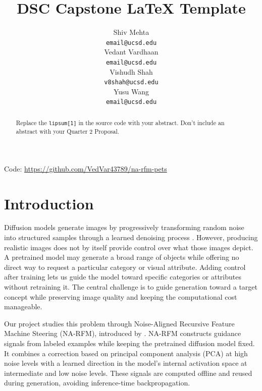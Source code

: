 \documentclass[12pt,letterpaper]{article}
\title{DSC Capstone LaTeX Template}
\author{Shiv Mehta \\
  {\tt email@ucsd.edu} \\\And
  Vedant Vardhaan \\
  {\tt email@ucsd.edu} \\\And
  Vishudh Shah \\
  {\tt v8shah@ucsd.edu} \\\And
  Yusu Wang \\
  {\tt email@ucsd.edu} \\}
\begin{document}
\maketitle


\begin{abstract}
    {
    \color{blue}
    Replace the \texttt{lipsum[1]} in the source code with your abstract. Don't include an abstract with your Quarter 2 Proposal.
    }
    \textcolor{LightGrey}{\lipsum[1]}
\end{abstract}

\begin{center}
Code: \url{https://github.com/VedVar43789/na-rfm-pets}
\end{center}

\maketoc
\clearpage


\section{Introduction}

Diffusion models generate images by progressively transforming random noise into structured samples through a learned denoising process \citep{ho2020ddpm}.
However, producing realistic images does not by itself provide control over what those images depict.
A pretrained model may generate a broad range of objects while offering no direct way to request a particular category or visual attribute.
Adding control after training lets us guide the model toward specific categories or attributes without retraining it.
The central challenge is to guide generation toward a target concept while preserving image quality and keeping the computational cost manageable.

Our project studies this problem through Noise-Aligned Recursive Feature Machine Steering (NA-RFM), introduced by \cite{wang2026steering}.
NA-RFM constructs guidance signals from labeled examples while keeping the pretrained diffusion model fixed.
It combines a correction based on principal component analysis (PCA) at high noise levels with a learned direction in the model's internal activation space at intermediate and low noise levels.
These signals are computed offline and reused during generation, avoiding inference-time backpropagation.
\end{document}
